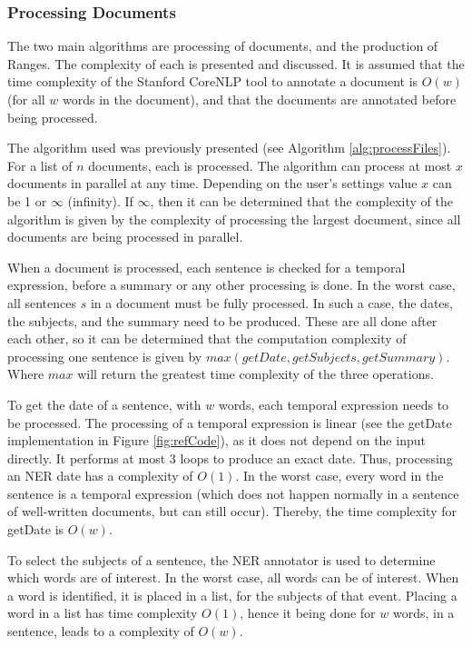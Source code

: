 \subsubsection{Processing Documents}
\par The two main algorithms are processing of documents, and the production of Ranges. The complexity of each is presented and discussed. It is assumed that the time complexity of the Stanford CoreNLP tool to annotate a document is $O(w)$ (for all $w$ words in the document), and that the documents are annotated before being processed.

\par The algorithm used was previously presented (see Algorithm \ref{alg:processFiles}). For a list of $n$ documents, each is processed. The algorithm can process at most $x$ documents in parallel at any time. Depending on the user's settings value $x$ can be 1 or $\infty$ (infinity). If $\infty$, then it can be determined that the complexity of the algorithm is given by the complexity of processing the largest document, since all documents are being processed in parallel. 

\par When a document is processed, each sentence is checked for a temporal expression, before a summary or any other processing is done. In the worst case, all sentences $s$ in a document must be fully processed. In such a case, the dates, the subjects, and the summary need to be produced. These are all done after each other, so it can be determined that the computation complexity of processing one sentence is given by $max(getDate, getSubjects, getSummary)$. Where $max$ will return the greatest time complexity of the three operations. 

\par To get the date of a sentence, with $w$ words, each temporal expression needs to be processed. The processing of a temporal expression is linear (see the getDate implementation in Figure \ref{fig:refCode}), as it does not depend on the input directly. It performs at most 3 loops to produce an exact date. Thus, processing an NER date has a complexity of $O(1)$. In the worst case, every word in the sentence is a temporal expression (which does not happen normally in a sentence of well-written documents, but can still occur). Thereby, the time complexity for getDate is $O(w)$.

\par To select the subjects of a sentence, the NER annotator is used to determine which words are of interest. In the worst case, all words can be of interest. When a word is identified, it is placed in a list, for the subjects of that event. Placing a word in a list has time complexity $O(1)$, hence it being done for $w$ words, in a sentence, leads to a complexity of $O(w)$.


